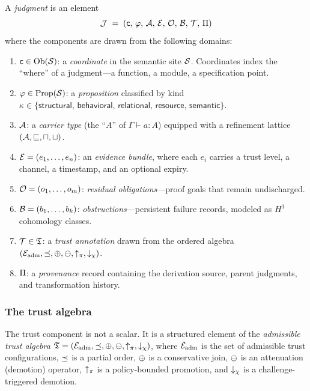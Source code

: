 \documentclass[11pt]{article}
\begin{document}
\begin{definition}\label{def:8tuple}
A \emph{judgment} is an element
\[
  \mathcal{J} \;=\; (\mathsf{c},\,\varphi,\,\mathcal{A},\,\mathcal{E},\,\mathcal{O},\,\mathcal{B},\,\mathcal{T},\,\Pi)
\]
where the components are drawn from the following domains:
\begin{enumerate}[label=(\alph*)]
  \item $\mathsf{c} \in \mathrm{Ob}(\mathcal{S})$: a \emph{coordinate} in the semantic site
        $\mathcal{S}$.  Coordinates index the ``where'' of a judgment---a function,
        a module, a specification point.
  \item $\varphi \in \mathrm{Prop}(\mathcal{S})$: a \emph{proposition} classified by
        kind $\kappa \in \{\mathsf{structural},\, \mathsf{behavioral},\,
        \mathsf{relational},\, \mathsf{resource},\, \mathsf{semantic}\}$.
  \item $\mathcal{A}$: a \emph{carrier type} (the ``$A$'' of $\Gamma \vdash a : A$)
        equipped with a refinement lattice $(\mathcal{A}, \sqsubseteq, \sqcap,
        \sqcup)$.
  \item $\mathcal{E} = (e_1, \ldots, e_n)$: an \emph{evidence bundle}, where each
        $e_i$ carries a trust level, a channel, a timestamp, and an optional
        expiry.
  \item $\mathcal{O} = (o_1, \ldots, o_m)$: \emph{residual obligations}---proof
        goals that remain undischarged.
  \item $\mathcal{B} = (b_1, \ldots, b_k)$: \emph{obstructions}---persistent
        failure records, modeled as $H^1$ cohomology classes.
  \item $\mathcal{T} \in \mathfrak{T}$: a \emph{trust annotation} drawn from the
        ordered algebra $(\mathcal{E}_{\mathrm{adm}}, \preceq, \oplus, \ominus, \uparrow_\pi,
        \downarrow_\chi)$.
  \item $\Pi$: a \emph{provenance} record containing the derivation source,
        parent judgments, and transformation history.
\end{enumerate}
\end{definition}

\subsubsection{The trust algebra}

The trust component is not a scalar.  It is a structured element of the
\emph{admissible trust algebra} $\mathfrak{T} = (\mathcal{E}_{\mathrm{adm}}, \preceq, \oplus, \ominus,
\uparrow_\pi, \downarrow_\chi)$, where $\mathcal{E}_{\mathrm{adm}}$ is the set of admissible trust
configurations, $\preceq$ is a partial order, $\oplus$ is a conservative join,
$\ominus$ is an attenuation (demotion) operator, $\uparrow_\pi$ is a
policy-bounded promotion, and $\downarrow_\chi$ is a challenge-triggered demotion.
\end{document}
